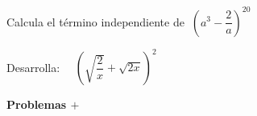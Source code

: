 \begin{mipropuesto}
	
	Calcula el término independiente de $\ \left( a^3-\dfrac{2}{a} \right)^{20} $	

\end{mipropuesto}

\vspace{-8mm}
\begin{flushright}
\begin{footnotesize} \textcolor{gris}{}	\end{footnotesize}
\end{flushright}

\begin{mipropuesto}

Desarrolla: $\quad \left( \sqrt{\dfrac 2 x }+\sqrt{2x} \right)^2$	
\end{mipropuesto}

\vspace{-8mm}
\begin{flushright}
\begin{footnotesize} \textcolor{gris}{}	\end{footnotesize}
\end{flushright}









\newpage

\begin{adjustwidth}{50pt}{250pt}
\begin{cuadro-naranja}
\textbf{\huge{Problemas $\boldsymbol{+}$}}\normalsize{$\, $}
\end{cuadro-naranja}	
\end{adjustwidth}


